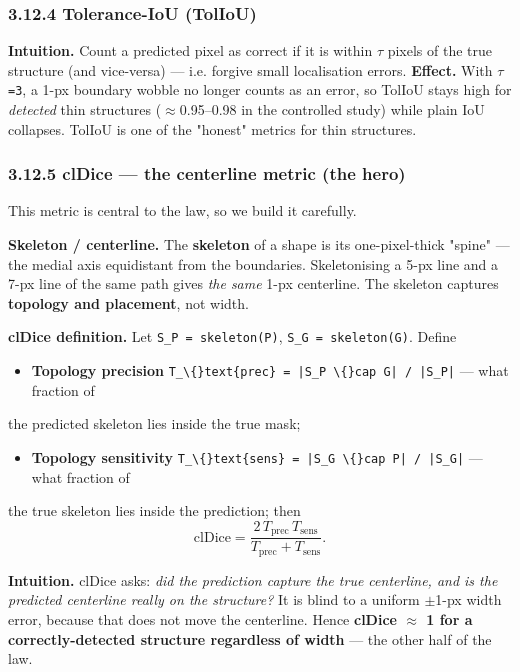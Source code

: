 \documentclass[11pt]{article}
\begin{document}
\subsubsection*{3.12.4 Tolerance-IoU (TolIoU)}
\textbf{Intuition.} Count a predicted pixel as correct if it is within \texttt{$\tau$} pixels of the true structure (and vice-versa) --- i.e. forgive small localisation errors. \textbf{Effect.} With \texttt{$\tau$=3}, a 1-px boundary wobble no longer counts as an error, so TolIoU stays high for \textit{detected} thin structures ($\approx$0.95--0.98 in the controlled study) while plain IoU collapses. TolIoU is one of the "honest" metrics for thin structures.

\subsubsection*{3.12.5 clDice --- the centerline metric (the hero)}
This metric is central to the law, so we build it carefully.

\textbf{Skeleton / centerline.} The \textbf{skeleton} of a shape is its one-pixel-thick "spine" --- the medial axis equidistant from the boundaries. Skeletonising a 5-px line and a 7-px line of the same path gives \textit{the same} 1-px centerline. The skeleton captures \textbf{topology and placement}, not width.

\textbf{clDice definition.} Let \texttt{S\_P = skeleton(P)}, \texttt{S\_G = skeleton(G)}. Define
\begin{itemize}\setlength{\itemsep}{1pt}
\item \textbf{Topology precision} \texttt{T\_\textbackslash\{\}text\{prec\} = |S\_P \textbackslash\{\}cap G| / |S\_P|} --- what fraction of
\end{itemize}
  the predicted skeleton lies inside the true mask;
\begin{itemize}\setlength{\itemsep}{1pt}
\item \textbf{Topology sensitivity} \texttt{T\_\textbackslash\{\}text\{sens\} = |S\_G \textbackslash\{\}cap P| / |S\_G|} --- what fraction of
\end{itemize}
  the true skeleton lies inside the prediction; then \[\text{clDice} = \frac{2\,T_\text{prec}\,T_\text{sens}}{T_\text{prec}+T_\text{sens}}.\]

\textbf{Intuition.} clDice asks: \textit{did the prediction capture the true centerline, and is the predicted centerline really on the structure?} It is blind to a uniform $\pm$1-px width error, because that does not move the centerline. Hence \textbf{clDice $\approx$ 1 for a correctly-detected structure regardless of width} --- the other half of the law.
\end{document}
